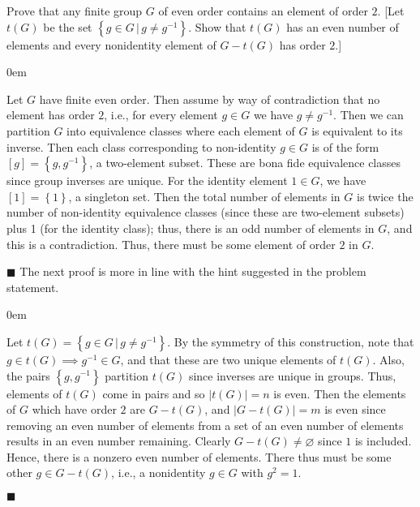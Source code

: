 \documentclass[12pt]{article}
\renewcommand{\qed}{\hfill$\blacksquare$}
\renewenvironment{proof}{\begin{addmargin}[1em]{0em}\begin{newproof}}{\end{newproof}\end{addmargin}\qed}
\newenvironment{problem}[2][Exercise]{\begin{trivlist}
\item[\hskip \labelsep {\bfseries #1}\hskip \labelsep {\bfseries #2.}]}{\end{trivlist}}
\begin{document}
\begin{problem}{1.1.31}
Prove that any finite group $G$ of even order contains an element of order $2$. [Let $t\left(G\right)$ be the set $\left\{g\in G\, | \, g\neq g^{-1} \right\}$. Show that $t\left(G\right)$ has an even number of elements and every nonidentity element of $G-t\left(G\right)$ has order $2$.]
\end{problem}
\begin{proof}
Let $G$ have finite even order. Then assume by way of contradiction that no element has order $2$, i.e., for every element $g\in G$ we have $g\neq g^{-1}$. Then we can partition $G$ into equivalence classes where each element of $G$ is equivalent to its inverse. Then each class corresponding to non-identity $g\in G$ is of the form $\left[g\right] = \left\{g,g^{-1}\right\}$, a two-element subset. These are bona fide equivalence classes since group inverses are unique. For the identity element $1\in G$, we have $\left[1\right] = \left\{1\right\}$, a singleton set. Then the total number of elements in $G$ is twice the number of non-identity equivalence classes (since these are two-element subsets) plus 1 (for the identity class); thus, there is an odd number of elements in $G$, and this is a contradiction. Thus, there must be some element of order $2$ in $G$.
\end{proof}
The next proof is more in line with the hint suggested in the problem statement.\\
\begin{proof}
Let $t\left(G\right) = \left\{ g\in G \, | \, g\neq g^{-1}\right\}$. By the symmetry of this construction, note that $g\in t\left(G\right) \implies g^{-1}\in G$, and that these are two unique elements of $t\left(G\right)$. Also, the pairs $\left\{g,g^{-1}\right\}$ partition $t\left(G\right)$ since inverses are unique in groups. Thus, elements of $t\left(G\right)$ come in pairs and so $\left|t\left(G\right)\right|=n$ is even. Then the elements of $G$ which have order $2$ are $G-t\left(G\right)$, and $\left|G-t\left(G\right)\right|=m$ is even since removing an even number of elements from a set of an even number of elements results in an even number remaining. Clearly $G-t\left(G\right) \neq \varnothing $ since $1$ is included. Hence, there is a nonzero even number of elements. There thus must be some other $g\in G-t\left(G\right)$, i.e., a nonidentity $g\in G$ with $g^2=1$.
\end{proof}
\end{document}
